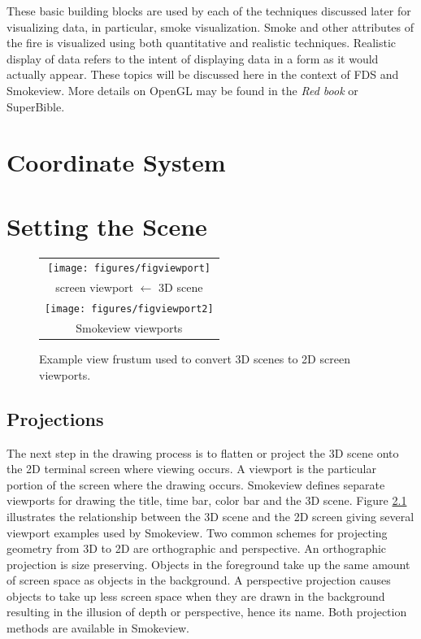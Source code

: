 \documentclass[11pt,twoside]{book}
\begin{document}
These basic building blocks are used by each of the techniques discussed later for visualizing data, in particular, smoke visualization.  Smoke and other attributes of the fire is visualized using both quantitative and realistic techniques.  Realistic display of data refers to the intent of displaying data in a form as it would actually appear.
These topics will be discussed here in the context of FDS and Smokeview.
More details on OpenGL may be found
in the {\em Red book}\cite{OpenGLRed} or SuperBible\cite{SUPERBIBLE}.


\chapter{Coordinate System}
\chapter{Setting the Scene}
\begin{figure}[t]
\begin{center}
\begin{tabular}{c}
\texttt{[image: figures/figviewport]}\\
screen viewport $\leftarrow$ 3D scene\\
\texttt{[image: figures/figviewport2]}\\
Smokeview viewports\\
\end{tabular}
\end{center}
\caption{Example view frustum used to convert 3D scenes to 2D
screen viewports.}
 \label{figviewports}
\end{figure}
\section{Projections}
The next step in the drawing process is to flatten or project the
3D scene onto the 2D terminal screen where viewing occurs. A
viewport is the particular portion of the screen where the drawing
occurs.  Smokeview defines separate viewports for drawing the
title, time bar, color bar and the 3D scene.  Figure
\ref{figviewports} illustrates the relationship between the 3D
scene and the 2D screen giving several viewport examples used by
Smokeview. Two common schemes for projecting geometry from 3D to
2D  are orthographic and perspective. An orthographic projection
is size preserving. Objects in the foreground take up the same
amount of screen space as objects in the background. A perspective
projection causes objects to take up less screen space when they
are drawn in the background resulting in the illusion of depth or
perspective, hence its name. Both projection methods are available
in Smokeview.
\end{document}
